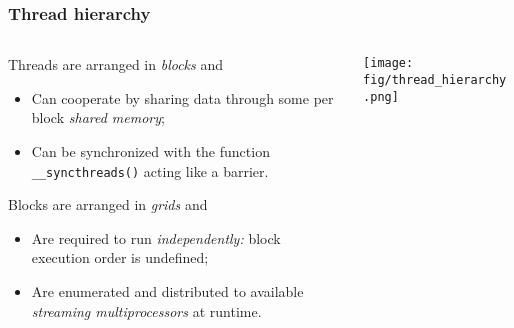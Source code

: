\begin{frame}
	\frametitle{Thread hierarchy}


	\begin{columns}
		\begin{column}{.66\columnwidth}
			\begin{block}{Threads are arranged in \emph{blocks} and}
				\begin{itemize}
					\item
						Can cooperate by sharing data through some per block \emph{shared memory};
					\item
						Can be synchronized with the function \lstinline!__syncthreads()! acting like a barrier.
				\end{itemize}
			\end{block}

			\begin{block}{Blocks are arranged in \emph{grids} and}
				\begin{itemize}
					\item
						Are required to run \emph{independently:} block execution order is \alert{undefined};
					\item
						Are enumerated and distributed to available \emph{streaming multiprocessors} at runtime.

				\end{itemize}
			\end{block}
		\end{column}

		\begin{column}{.34\columnwidth}
			\texttt{[image: fig/thread\_hierarchy.png]}
		\end{column}
	\end{columns}
\end{frame}
